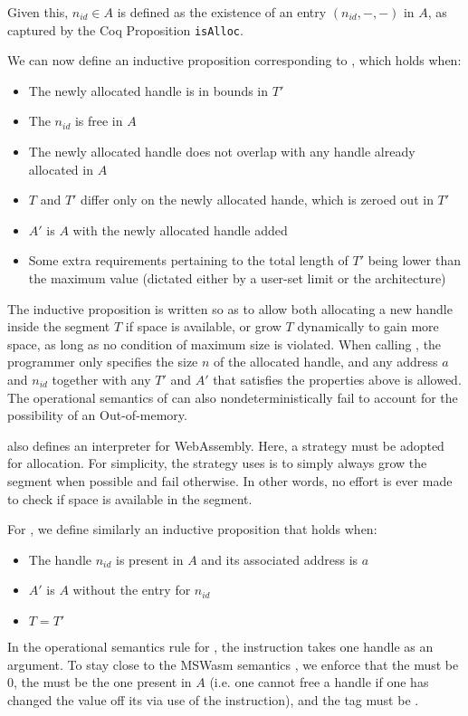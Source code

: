 \documentclass[a4paper]{article}
\begin{document}
Given this, \( n_{id}\in A \) is defined as the existence of an entry \( (n_{id}, -, -) \) in \( A \), as captured by the Coq Proposition {\tt isAlloc}.

We can now define an inductive proposition corresponding to , which holds when:
\begin{itemize}
\item The newly allocated handle is in bounds in \( T' \)
\item The \xxWid \( n_{id} \) is free in \( A \)
\item The newly allocated handle does not overlap with any handle already allocated in \( A \)
\item \( T \) and \( T' \) differ only on the newly allocated hande, which is zeroed out in \( T' \)
\item \( A' \) is \( A \) with the newly allocated handle added
\item Some extra requirements pertaining to the total length of \( T' \) being lower than the maximum value (dictated either by a user-set limit or the architecture)
\end{itemize}
The inductive proposition is written so as to allow both allocating a new handle inside the segment \( T \) if space is available, or grow \( T \) dynamically to gain more space, as long as no condition of maximum size is violated. When calling \xxWsegalloc, the programmer only specifies the size \( n \) of the allocated handle, and any address \( a \) and \xxWid \( n_{id} \) together with any \( T' \) and \( A' \) that satisfies the properties above is allowed. The operational semantics of \xxWsegalloc can also nondeterministically fail to account for the possibility of an Out-of-memory.

\iriswasm also defines an interpreter for WebAssembly. Here, a strategy must be adopted for allocation. For simplicity, the strategy \irismswasm uses is to simply always grow the segment when possible and fail otherwise. In other words, no effort is ever made to check if space is available in the segment.

For , we define similarly an inductive proposition that holds when:
\begin{itemize}
\item The handle \xxWid \( n_{id} \) is present in \( A \) and its associated address is \( a \)
\item \( A' \) is \( A \) without the entry for \( n_{id} \)
\item \( T = T' \)
\end{itemize}
In the operational semantics rule for \xxWsegfree, the instruction takes one handle as an argument. To stay close to the MSWasm semantics \cite{mswasm}, we enforce that the \xxWoffset must be 0, the \xxWbase must be the one present in \( A \) (i.e. one cannot free a handle if one has changed the value off its \xxWbase via use of the \xxWslice instruction), and the \xxWvalid tag must be \xxCtrue. 
\end{document}
